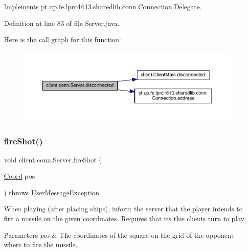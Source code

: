 Implements \hyperlink{interfacept_1_1up_1_1fe_1_1lpro1613_1_1sharedlib_1_1conn_1_1_connection_1_1_delegate_a39547a28a5b1818ca952e8d3d8da15ba}{pt.\+up.\+fe.\+lpro1613.\+sharedlib.\+conn.\+Connection.\+Delegate}.



Definition at line 83 of file Server.\+java.

Here is the call graph for this function\+:
\nopagebreak
\begin{figure}[H]
\begin{center}
\leavevmode
\includegraphics[width=350pt]{classclient_1_1conn_1_1_server_ae2a0ab226b1622da8e19137fb89bdc81_cgraph}
\end{center}
\end{figure}
\hypertarget{classclient_1_1conn_1_1_server_ab1d2fa19e855a803efff54edd2113d83}{}\label{classclient_1_1conn_1_1_server_ab1d2fa19e855a803efff54edd2113d83} 
\subsubsection{\texorpdfstring{fire\+Shot()}{fireShot()}}
{\footnotesize\ttfamily void client.\+conn.\+Server.\+fire\+Shot (\begin{DoxyParamCaption}\item[{\hyperlink{classpt_1_1up_1_1fe_1_1lpro1613_1_1sharedlib_1_1utils_1_1_coord}{Coord}}]{pos }\end{DoxyParamCaption}) throws \hyperlink{classpt_1_1up_1_1fe_1_1lpro1613_1_1sharedlib_1_1exceptions_1_1_user_message_exception}{User\+Message\+Exception}}

When playing (after placing ships), inform the server that the player intends to fire a missile on the given coordinates. Requires that it\textquotesingle{}s this client\textquotesingle{}s turn to play 
\begin{DoxyParams}{Parameters}
{\em pos} & The coordinates of the square on the grid of the opponent where to fire the missile. \\
\hline
\end{DoxyParams}

